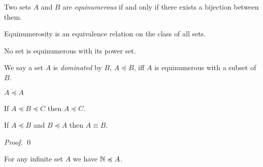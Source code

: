 \begin{definition}[Equinumerous]
    Two sets $A$ and $B$ are \emph{equinumerous} if and only if there exists
    a bijection between them.
\end{definition}

\begin{theorem}
    Equinumerosity is an equivalence relation on the class of all sets.
\end{theorem}

\begin{theorem}[Cantor]
    No set is equinumerous with its power set.
\end{theorem}

\begin{definition}
    We say a set $A$ is \emph{dominated} by $B$, $A \preccurlyeq B$, iff
    $A$ is equinumerous with a subset of $B$.
\end{definition}

\begin{theorem}
    $A \preccurlyeq A$
\end{theorem}

\begin{theorem}
    If $A \preccurlyeq B \preccurlyeq C$ then $A \preccurlyeq C$.
\end{theorem}

\begin{theorem}
    If $A \preccurlyeq B$ and $B \preccurlyeq A$ then $A \equiv B$.
\end{theorem}

\begin{proof}
    \pf
    \qed
\end{proof}

\begin{theorem}[AC]
    For any infinite set $A$ we have $\mathbb{N} \preccurlyeq A$.
\end{theorem}

